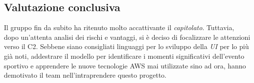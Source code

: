 \subsection{Valutazione conclusiva}
Il gruppo fin da subito ha ritenuto molto accattivante il \textit{capitolato\glo}. Tuttavia, dopo un'attenta analisi dei rischi e vantaggi, si è deciso di focalizzare le attenzioni verso il C2. Sebbene siano consigliati linguaggi per lo sviluppo della \textit{UI\glo} per lo più già noti, addestrare il modello per identificare i momenti significativi dell'evento sportivo e apprendere le nuove tecnologie AWS mai utilizzate sino ad ora, hanno demotivato il team nell'intraprendere questo progetto.